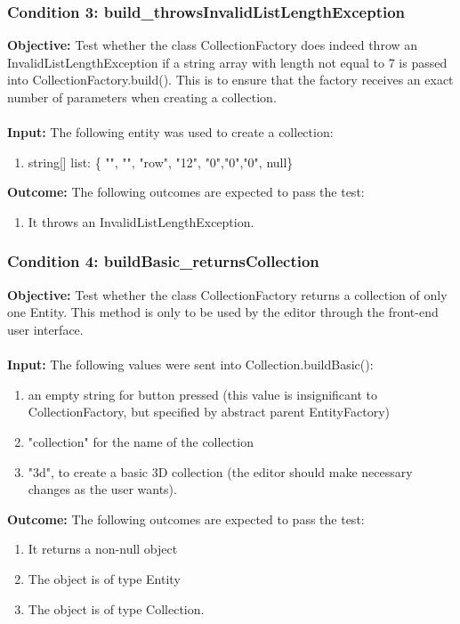 \documentclass[a4paper,12pt]{article}
\begin{document}
		\subsubsection{Condition 3: build\_throwsInvalidListLengthException}
			\textbf{Objective:} Test whether the class CollectionFactory does indeed throw an InvalidListLengthException if a string array with length not equal to 7 is passed into CollectionFactory.build(). This is to ensure that the factory receives an exact number of parameters when creating a collection.\\\\
			\textbf{Input:} The following entity was used to create a collection:
				\begin{enumerate}
					\item string[] list: \{ "", "", "row", "12", "0","0","0", null\}
				\end{enumerate}
			\textbf{Outcome:} The following outcomes are expected to pass the test:
				\begin{enumerate}
					\item It throws an InvalidListLengthException.
				\end{enumerate}
		\subsubsection{Condition 4: buildBasic\_returnsCollection}
			\textbf{Objective:} Test whether the class CollectionFactory returns a collection of only one Entity. This method is only to be used by the editor through the front-end user interface.\\\\
			\textbf{Input:} The following values were sent into Collection.buildBasic():
				\begin{enumerate}
					\item an empty string for button pressed (this value is insignificant to CollectionFactory, but specified by abstract parent EntityFactory)
					\item "collection" for the name of the collection
					\item "3d", to create a basic 3D collection (the editor should make necessary changes as the user wants).\\
				\end{enumerate}
			\textbf{Outcome:} The following outcomes are expected to pass the test:
				\begin{enumerate}
					\item It returns a non-null object
					\item The object is of type Entity
					\item The object is of type Collection.
				\end{enumerate}
\end{document}
